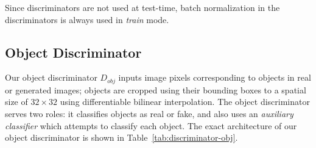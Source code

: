 \documentclass[10pt,twocolumn,letterpaper]{article}
\begin{document}
Since discriminators are not used at test-time, batch normalization in the discriminators
is always used in \emph{train} mode.

\subsection{Object Discriminator}
Our object discriminator $D_{obj}$ inputs image pixels corresponding to objects in
real or generated images; objects are cropped using their bounding boxes to a spatial
size of $32\times32$ using differentiable bilinear interpolation. The object discriminator
serves two roles: it classifies objects as real or fake, and also uses an \emph{auxiliary classifier}
which attempts to classify each object. The exact architecture of our object discriminator
is shown in Table~\ref{tab:discriminator-obj}.

\begin{table}
  \centering
  \setlength{\tabcolsep}{1mm}
  \vspace{1mm}
  \caption{
    Architecture of our object discriminator $D_{obj}$. The input to the object discriminator
    is a $32\times32$ crop of an object in either a generated or real image. The object
    discriminator outputs both a score for real / fake (11) and a classification score over the
    object categories $\mathcal{C}$ (12). In this model all convolution layers have stride 2 and
    no zero padding. LeakyReLU uses a negative slope of 0.2.
  }
  \label{tab:discriminator-obj}
\end{table}
\end{document}
